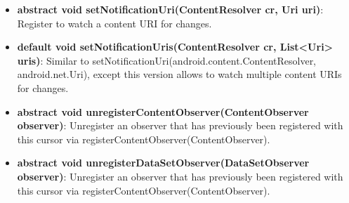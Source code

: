 \documentclass{report}
\begin{document}
\begin{itemize}
\begin{itemize}
\begin{itemize}
                \item \textbf{abstract void	setNotificationUri(ContentResolver cr, Uri uri)}: Register to watch a content URI for changes.
                \item \textbf{default void	setNotificationUris(ContentResolver cr, List<Uri> uris)}: Similar to setNotificationUri(android.content.ContentResolver, android.net.Uri), except this version allows to watch multiple content URIs for changes.
                \item \textbf{abstract void	unregisterContentObserver(ContentObserver observer)}: Unregister an observer that has previously been registered with this cursor via registerContentObserver(ContentObserver).
                \item \textbf{abstract void	unregisterDataSetObserver(DataSetObserver observer)}: Unregister an observer that has previously been registered with this cursor via registerContentObserver(ContentObserver).
            \end{itemize}
    \end{itemize}

    \pagebreak 

\end{itemize}
\end{document}
